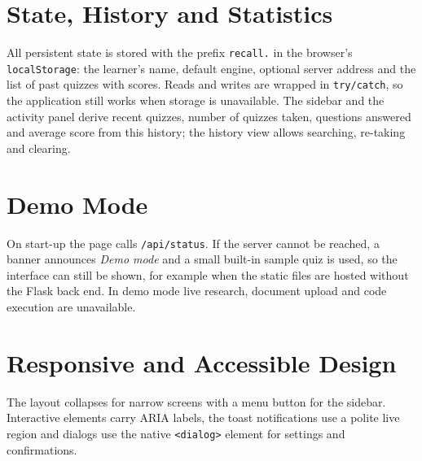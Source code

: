 
\section{State, History and Statistics}
All persistent state is stored with the prefix \texttt{recall.} in the browser's \texttt{localStorage}: the learner's name, default engine, optional server address and the list of past quizzes with scores. Reads and writes are wrapped in \texttt{try/catch}, so the application still works when storage is unavailable. The sidebar and the activity panel derive recent quizzes, number of quizzes taken, questions answered and average score from this history; the history view allows searching, re-taking and clearing.


\section{Demo Mode}
On start-up the page calls \texttt{/api/status}. If the server cannot be reached, a banner announces \textit{Demo mode} and a small built-in sample quiz is used, so the interface can still be shown, for example when the static files are hosted without the Flask back end. In demo mode live research, document upload and code execution are unavailable.

\section{Responsive and Accessible Design}
The layout collapses for narrow screens with a menu button for the sidebar. Interactive elements carry ARIA labels, the toast notifications use a polite live region and dialogs use the native \texttt{<dialog>} element for settings and confirmations.
